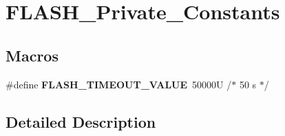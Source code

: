 \hypertarget{group___f_l_a_s_h___private___constants}{}\section{F\+L\+A\+S\+H\+\_\+\+Private\+\_\+\+Constants}
\label{group___f_l_a_s_h___private___constants}
\subsection*{Macros}
\begin{DoxyCompactItemize}
\item 
\mbox{\label{group___f_l_a_s_h___private___constants_ga76e8ea58ef37913dcdb61efae2d6ab8f}} 
\#define {\bfseries F\+L\+A\+S\+H\+\_\+\+T\+I\+M\+E\+O\+U\+T\+\_\+\+V\+A\+L\+UE}~50000\+U /$\ast$ 50 s $\ast$/
\end{DoxyCompactItemize}


\subsection{Detailed Description}

